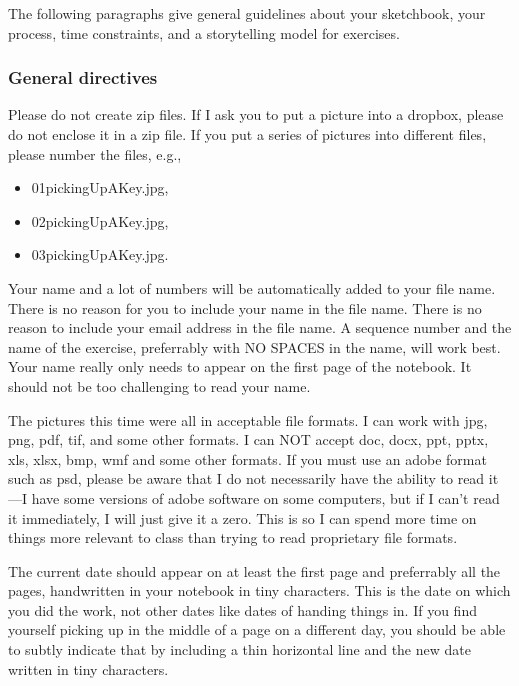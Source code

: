 \hypertarget{completing-exercises}{%
\label{completing-exercises}}

The following paragraphs give general guidelines about your sketchbook,
your process, time constraints, and a storytelling model for exercises.

\hypertarget{general-directives}{%
\subsubsection{General directives}\label{general-directives}}

Please do not create zip files. If I ask you to put a picture into a
dropbox, please do not enclose it in a zip file. If you put a series of
pictures into different files, please number the files, e.g.,

\begin{itemize}
\tightlist
\item
  01pickingUpAKey.jpg,
\item
  02pickingUpAKey.jpg,
\item
  03pickingUpAKey.jpg.
\end{itemize}

Your name and a lot of numbers will be automatically added to your file
name. There is no reason for you to include your name in the file name.
There is no reason to include your email address in the file name. A
sequence number and the name of the exercise, preferrably with NO SPACES
in the name, will work best. Your name really only needs to appear on
the first page of the notebook. It should not be too challenging to read
your name.

The pictures this time were all in acceptable file formats. I can work
with jpg, png, pdf, tif, and some other formats. I can NOT accept doc,
docx, ppt, pptx, xls, xlsx, bmp, wmf and some other formats. If you must
use an adobe format such as psd, please be aware that I do not
necessarily have the ability to read it---I have some versions of adobe
software on some computers, but if I can't read it immediately, I will
just give it a zero. This is so I can spend more time on things more
relevant to class than trying to read proprietary file formats.

The current date should appear on at least the first page and
preferrably all the pages, handwritten in your notebook in tiny
characters. This is the date on which you did the work, not other dates
like dates of handing things in. If you find yourself picking up in the
middle of a page on a different day, you should be able to subtly
indicate that by including a thin horizontal line and the new date
written in tiny characters.

